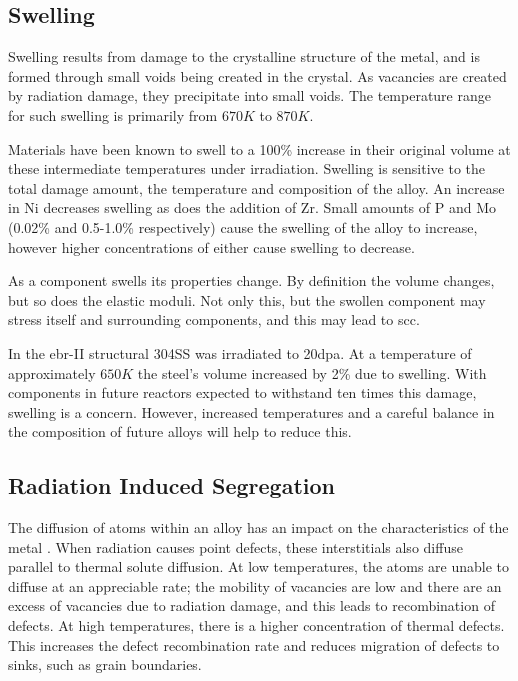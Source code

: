 \FloatBarrier

\subsection{Swelling}

Swelling results from damage to the crystalline structure of the metal, and is formed through small voids being created in the crystal.  As vacancies are created by radiation damage, they precipitate into small voids.  The temperature range for such swelling is primarily from $670K$ to $870K$.

Materials have been known to swell to a 100\% increase in their original volume at these intermediate temperatures under irradiation\cite{wasstrucaustenitic}.  Swelling is sensitive to the total damage amount, the temperature and composition of the alloy.  An increase in Ni decreases swelling as does the addition of Zr.  Small amounts of \Gls{P} and Mo (0.02\% and 0.5-1.0\% respectively) cause the swelling of the alloy to increase, however higher concentrations of either cause swelling to decrease\cite{swellingris}.

As a component swells its properties change.  By definition the volume changes, but so does the elastic moduli.  Not only this, but the swollen component may stress itself and surrounding components, and this may lead to \acrshort{scc}.

In the \acrshort{ebr}-II structural \gls{304SS} was irradiated to 20\acrshort{dpa}.  At a temperature of approximately $650K$ the steel's volume increased by 2\% due to swelling\cite{radisandvoid}.  With components in future reactors expected to withstand ten times this damage, swelling is a concern.  However, increased temperatures and a careful balance in the composition of future alloys will help to reduce this.



\FloatBarrier


\subsection{Radiation Induced Segregation}

The diffusion of atoms within an alloy has an impact on the characteristics of the metal \cite{nickeldiffusion}.  When radiation causes point defects, these interstitials also diffuse parallel to thermal solute diffusion.  At low temperatures, the atoms are unable to diffuse at an appreciable rate; the mobility of vacancies are low\cite{gswas} and there are an excess of vacancies due to radiation damage, and this leads to recombination of defects.  At high temperatures, there is a higher concentration of thermal defects\cite{lightwaterallenbusby}.  This increases the defect recombination rate and reduces migration of defects to sinks, such as grain boundaries.

